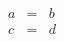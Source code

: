 \documentclass{article}
\begin{document}
\makeatletter
\def\arraycolsep{4pt}
\makeatother
\begin{eqnarray}
  a &=& b \\
  c &=& d
\end{eqnarray}
\end{document}
